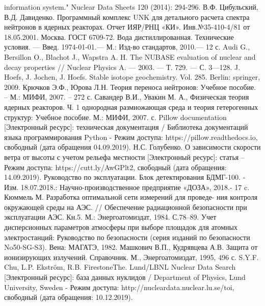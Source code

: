 \begin{thebibliography}{99}
		information system." Nuclear Data Sheets 120 (2014): 294-296.
	 В.Ф. Цибульский, В.Д. Давиденко. Программный комплекс UNK для детального расчета спектра нейтронов в 
		ядерных реакторах. Отчет ИЯР/РНЦ «КИ». Инв.№35-410-4/81 от 18.05.2001. Москва.
	 ГОСТ 6709-72. Вода дистиллированная. Технические условия. — Введ. 1974-01-01.— М.: Изд-во 
		стандартов, 2010.— 12 с.
	 Audi G., Bersillon O., Blachot J., Wapstra A. H. The NUBASE evaluation of nuclear and decay properties 
		// Nuclear Physics A. — 2003. — Т. 729. — С. 3—128. 
	 J. Hoefs, J. Jochen, J. Hoefs. Stable isotope geochemistry. Vol. 285. Berlin: springer, 2009.
	 Крючков Э.Ф., Юрова Л.Н. Теория переноса нейтронов: Учебное пособие. – М.: МИФИ, 2007. – 272 с. 
	 Савандер В.И., Увакин М. А., Физическая теория ядерных реакторов. Ч. 1 однородная размножающая среда 
		и теория гетерогенных структур: Учебное пособие. М.: МИФИ, 2007. с.
	 Pillow documentation [Электронный ресурс]: техническая документация / Библиотека документаций языка программирования 
		Python - Режим доступа: https://pillow.readthedocs.io, свободный (дата обращения 04.09.2019).
	 Н.С. Голубенко. О зависимости скорости ветра от высоты с учетом рельефа местности [Электронный ресурс]: статья – 
		Режим доступа: https://cutt.ly/AwGPlt2, свободный (дата обращения: 14.09.2019).
	 Руководство по эксплуатации. Блок детектирования БДМГ-100. - Изм. 18.07.2018.: Научно-производственное предприятие 
		«ДОЗА», 2018.- 17 c.
	 Кюммель М. Разработка оптимальной сети измерений для проведе- ния контроля окружающей среды на АЭС. // 
		Обеспечение радиационной безопасности при эксплуатации АЭС. Кн.5. М.: Энергоатомиздат, 1984. С.78–89.
	 Учет дисперсионных параметров атмосферы при выборе площадок для атомных электростанций: Руководство по безопасности 
		(серия изданий по безопасности No50-SG-S3). Вена: МАГАТЭ, 1982.
	 Машкович В.П., Кудрявцева А.В. Защита от ионизирующих излучений. Справочник. М., Энергоатомиздат, 1995, 496 с.
	 S.Y.F. Chu, L.P. Ekström, R.B. FirestoneThe. Lund/LBNL Nuclear Data Search [Электронный ресурс]: 
		база данных нуклидов /  Department of Physics, Lund University, Sweden - Режим доступа: http://nucleardata.nuclear.lu.se/toi, 
		свободный (дата обращения: 10.12.2019).
\end{thebibliography}